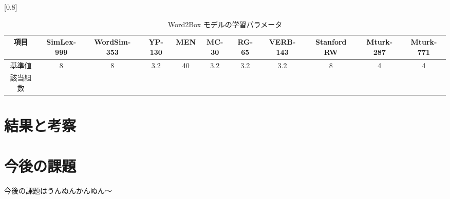 \documentclass[twocolumn]{jarticle}     %
\begin{document}
\begin{table*}[t]
  \centering
  \caption{Word2Box モデルの学習パラメータ}
  \label{tb:dataset_detail}
  \scalebox{0.8}[0.8]{
  \begin{tabular}{|c||c|c|c|c|c|c|c|c|c|c|} \hline
      項目&SimLex-999&WordSim-353&YP-130&MEN&MC-30&RG-65&VERB-143&Stanford RW&Mturk-287&Mturk-771 \\ \hline \hline
      基準値&8&8&3.2&40&3.2&3.2&3.2&8&4&4 \\ \hline
      該当組数& \\
      \hline
  \end{tabular}
  }
\end{table*}


\section{結果と考察}

\section{今後の課題}
今後の課題はうんぬんかんぬん〜

\end{document}
